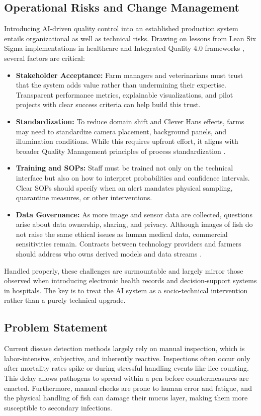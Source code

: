 \documentclass[12pt,a4paper]{article}
\begin{document}
\subsection{Operational Risks and Change Management}
Introducing AI-driven quality control into an established production system entails organizational as well as technical risks. Drawing on lessons from Lean Six Sigma implementations in healthcare \citep{Henrique17022020} and Integrated Quality 4.0 frameworks \citep{10.1108/TQM-11-2023-0361}, several factors are critical:
\begin{itemize}
    \item \textbf{Stakeholder Acceptance:} Farm managers and veterinarians must trust that the system adds value rather than undermining their expertise. Transparent performance metrics, explainable visualizations, and pilot projects with clear success criteria can help build this trust.
    \item \textbf{Standardization:} To reduce domain shift and Clever Hans effects, farms may need to standardize camera placement, background panels, and illumination conditions. While this requires upfront effort, it aligns with broader Quality Management principles of process standardization \citep{montgomery2020introduction}.
    \item \textbf{Training and SOPs:} Staff must be trained not only on the technical interface but also on how to interpret probabilities and confidence intervals. Clear SOPs should specify when an alert mandates physical sampling, quarantine measures, or other interventions.
    \item \textbf{Data Governance:} As more image and sensor data are collected, questions arise about data ownership, sharing, and privacy. Although images of fish do not raise the same ethical issues as human medical data, commercial sensitivities remain. Contracts between technology providers and farmers should address who owns derived models and data streams \citep{BIAZI2023102360}.
\end{itemize}

Handled properly, these challenges are surmountable and largely mirror those observed when introducing electronic health records and decision-support systems in hospitals. The key is to treat the AI system as a socio-technical intervention rather than a purely technical upgrade.

\subsection{Problem Statement}
Current disease detection methods largely rely on manual inspection, which is labor-intensive, subjective, and inherently reactive. Inspections often occur only after mortality rates spike or during stressful handling events like lice counting. This delay allows pathogens to spread within a pen before countermeasures are enacted. Furthermore, manual checks are prone to human error and fatigue, and the physical handling of fish can damage their mucus layer, making them more susceptible to secondary infections.
\end{document}
